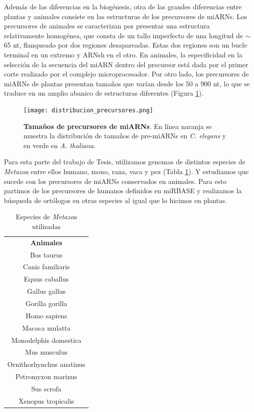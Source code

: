 Además de las diferencias en la biogénesis, otra de las grandes diferencias entre plantas y animales consiste en las estructuras de los precursores de miARNs.
Los precursores de animales se caracterizan por presentar una estructura relativamente homogénea, que consta de un tallo imperfecto de una longitud de $\sim$65 nt, flanqueado por dos regiones desapareadas.
Estas dos regiones son un bucle terminal en un extremo y ARNsh en el otro.
En animales, la especificidad en la selección de la secuencia del miARN dentro del precursor está dada por el primer corte realizado por el complejo microprocesador.
Por otro lado, los precursores de miARNs de plantas presentan tamaños que varían desde los 50 a 900 nt, lo que se traduce en un amplio abanico de estructuras diferentes (Figura \ref{fig:distribucion_precursores}).

\begin{figure}[htbp!] 
	\centering    
	\texttt{[image: distribucion\_precursores.png]}
	\caption[Tamaños de precursores de miARNs]{
		\textbf{Tamaños de precursores de miARNs}.
		En línea naranja se muestra la distribución de tamaños de pre-miARNs en \textit{C. elegans} y en verde en \textit{A. thaliana}.
	}
	\label{fig:distribucion_precursores}
\end{figure}


Para esta parte del trabajo de Tesis, utilizamos genomas de distintos especies de \textit{Metazoa} entre ellos humano, mono, rana, vaca y pez (Tabla \ref{table:db_metazoa}).
Y estudiamos que sucede con los precursores de miARNs conservados en animales.
Para esto partimos de los precursores de humanos definidos en miRBASE y realizamos la búsqueda de ortólogos en otras especies al igual que lo hicimos en plantas.

\begin{table}[!htbp]
\centering
\small
\caption{Especies de \textit{Metazoa} utilizadas}
\label{table:db_metazoa}
\begin{tabular}{c}
\rowcolor[HTML]{ECF4FF} 
\textbf{Animales}        \\
	Bos taurus               \\
	Canis familiaris         \\
	Equus caballus           \\
	Gallus gallus            \\
	Gorilla gorilla          \\
	Homo sapiens             \\
	Macaca mulatta           \\
	Monodelphis domestica    \\
	Mus musculus             \\
	Ornithorhynchus anatinus \\
	Petromyzon marinus       \\
	Sus scrofa               \\
	Xenopus tropicalis      
\end{tabular}
\end{table}

